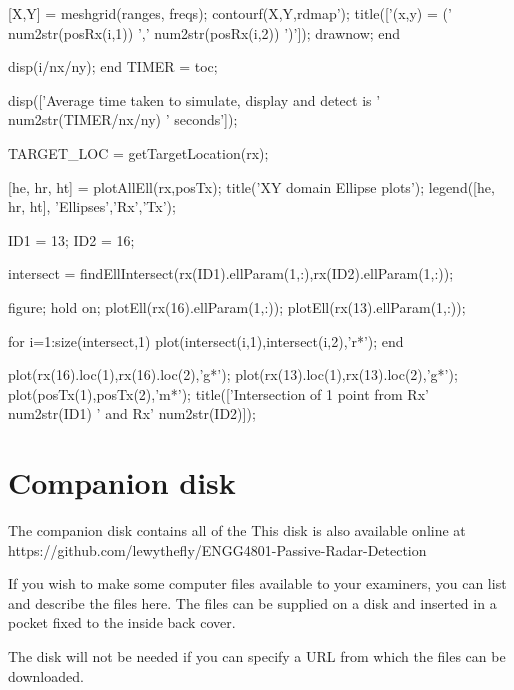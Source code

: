 \documentclass[12pt,openany,a4paper]{book}
\begin{document}
\begin{spverbatim}
        [X,Y] = meshgrid(ranges, freqs);
        contourf(X,Y,rdmap');
        title(['(x,y) = (' num2str(posRx(i,1)) ',' num2str(posRx(i,2)) ')']);
        drawnow;
    end
    
    disp(i/nx/ny);
end
TIMER = toc; %

disp(['Average time taken to simulate, display and detect is '
num2str(TIMER/nx/ny) ' seconds']);

TARGET_LOC = getTargetLocation(rx);

[he, hr, ht] = plotAllEll(rx,posTx);
title('XY domain Ellipse plots');
legend([he, hr, ht], 'Ellipses','Rx','Tx');

ID1 = 13;
ID2 = 16;

intersect = findEllIntersect(rx(ID1).ellParam(1,:),rx(ID2).ellParam(1,:));

figure; hold on;
plotEll(rx(16).ellParam(1,:));
plotEll(rx(13).ellParam(1,:));

for i=1:size(intersect,1)
    plot(intersect(i,1),intersect(i,2),'r*');    
end

plot(rx(16).loc(1),rx(16).loc(2),'g*');
plot(rx(13).loc(1),rx(13).loc(2),'g*');
plot(posTx(1),posTx(2),'m*');
title(['Intersection of 1 point from Rx' num2str(ID1) ' and Rx'
num2str(ID2)]);
\end{spverbatim}

\chapter{Companion disk}

The companion disk contains all of the 
This disk is also available online at \\
https://github.com/lewythefly/ENGG4801-Passive-Radar-Detection

If you wish to make some computer files available to your examiners,
you can list and describe the files here.  The files can be supplied
on a disk and inserted in a pocket fixed to the inside back cover.

The disk will not be needed if you can specify a URL from which the
files can be downloaded.

\cleardoublepage
\end{document}
